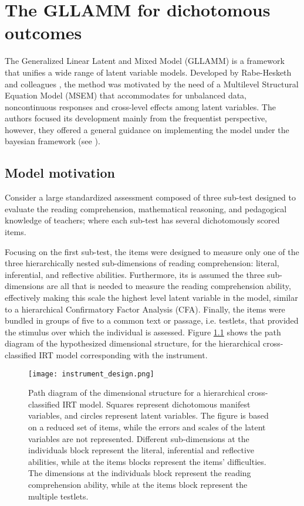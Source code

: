 \chapter{The GLLAMM for dichotomous outcomes} \label{chap:framework}

The Generalized Linear Latent and Mixed Model (GLLAMM) is a framework that unifies a wide range of latent variable models. Developed by Rabe-Hesketh and colleagues \cite{Rabe_et_al_2004a, Rabe_et_al_2004b, Rabe_et_al_2004c, Skrondal_et_al_2004a, Rabe_et_al_2012}, the method was motivated by the need of a Multilevel Structural Equation Model (MSEM) that accommodates for unbalanced data, noncontinuous responses and cross-level effects among latent variables. The authors focused its development mainly from the frequentist perspective, however, they offered a general guidance on implementing the model under the bayesian framework (see \citet{Skrondal_et_al_2004a}).


\section{Model motivation} \label{sect:motivation}

Consider a large standardized assessment composed of three sub-test designed to evaluate the reading comprehension, mathematical reasoning, and pedagogical knowledge of teachers; where each sub-test has several dichotomously scored items. 

Focusing on the first sub-test, the items were designed to measure only one of the three hierarchically nested sub-dimensions of reading comprehension: literal, inferential, and reflective abilities. Furthermore, its is assumed the three sub-dimensions are all that is needed to measure the reading comprehension ability, effectively making this scale the highest level latent variable in the model, similar to a hierarchical Confirmatory Factor Analysis (CFA). Finally, the items were bundled in groups of five to a common text or passage, i.e. testlets, that provided the stimulus over which the individual is assessed. Figure \ref{fig:design} shows the path diagram of the hypothesized dimensional structure, for the hierarchical cross-classified IRT model corresponding with the instrument.

\begin{figure}[h] \label{fig:design}
	\centering
	\texttt{[image: instrument\_design.png]}
	\caption{Path diagram of the dimensional structure for a hierarchical cross-classified IRT model. Squares represent dichotomous manifest variables, and circles represent latent variables. The figure is based on a reduced set of items, while the errors and scales of the latent variables are not represented. Different sub-dimensions at the individuals block represent the literal, inferential and reflective abilities, while at the items blocks represent the items' difficulties. The dimensions at the individuals block represent the reading comprehension ability, while at the items block represent the multiple testlets.}
\end{figure}

